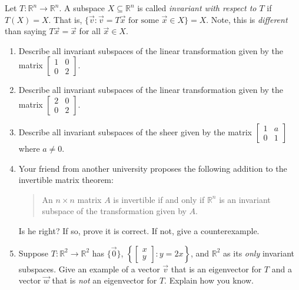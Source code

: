 \documentclass[letter]{article}
\newcommand{\R}{\mathbb{R}}
\newcommand{\mat}[1]{\begin{bmatrix}#1\end{bmatrix}}
\begin{document}
\begin{enumerate}
		Let $T:\R^n\to\R^n$. A subspace $X\subseteq \R^n$ is called \emph{invariant with respect to $T$} if $T(X)=X$.  That is,
		       $\{\vec v:\vec v=T\vec x\text{ for some }\vec x\in X\}=X$.  Note, this is \emph{different} than saying $T\vec x=\vec x$ for all $\vec x\in X$.
		\begin{enumerate}
		       \item Describe all invariant subspaces of the linear transformation given by the matrix $\mat{1&0\\0&2}$.
		       \item Describe all invariant subspaces of the linear transformation given by the matrix $\mat{2&0\\0&2}$.
		       \item Describe all invariant subspaces of the sheer given by the matrix $\mat{1&a\\0&1}$ where $a\neq 0$.
			\item Your friend from another university proposes the following addition to the invertible matrix theorem:
				\begin{quote}
					An $n\times n$ matrix $A$ is invertible if and only if $\R^n$ is an invariant subspace of the transformation
					given by $A$.
				\end{quote}
				Is he right?  If so, prove it is correct.  If not, give a counterexample.
			\item Suppose $T:\R^2\to\R^2$ has $\{\vec 0\}$, $\left\{\mat{x\\y}:y=2x\right\}$, and $\R^2$ as its \emph{only}
				invariant subspaces.  Give an example of a vector $\vec v$ that is an eigenvector for $T$ and a vector $\vec w$
				that is \emph{not} an eigenvector for $T$.  Explain how you know.
		\end{enumerate}
		
		
	\end{enumerate}
\end{document}

